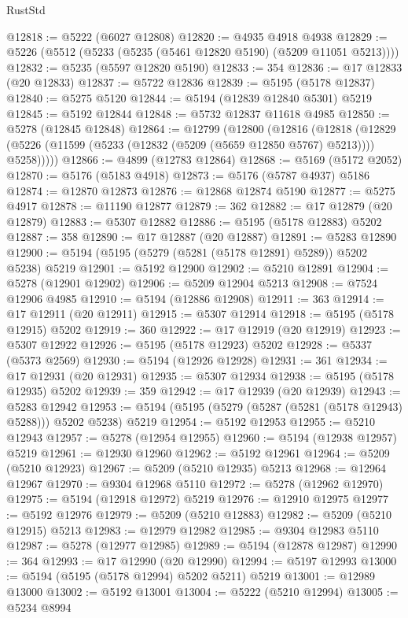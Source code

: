 \begin{lexlean}{RustStd}
\begin{coremodule}
@12818 := @5222 (@6027 @12808)
@12820 := @4935 @4918 @4938
@12829 := @5226 (@5512 (@5233 (@5235 (@5461 @12820 @5190) (@5209 @11051 @5213))))
@12832 := @5235 (@5597 @12820 @5190)
@12833 := 354
@12836 := @17 @12833 (@20 @12833)
@12837 := @5722 @12836
@12839 := @5195 (@5178 @12837)
@12840 := @5275 @5120
@12844 := @5194 (@12839 @12840 @5301) @5219
@12845 := @5192 @12844
@12848 := @5732 @12837 @11618 @4985
@12850 := @5278 (@12845 @12848)
@12864 := @12799
    (@12800
      (@12816
        (@12818
          (@12829 (@5226 (@11599 (@5233 (@12832 (@5209 (@5659 @12850 @5767) @5213)))) @5258)))))
@12866 := @4899 (@12783 @12864)
@12868 := @5169 (@5172 @2052)
@12870 := @5176 (@5183 @4918)
@12873 := @5176 (@5787 @4937) @5186
@12874 := @12870 @12873
@12876 := @12868 @12874 @5190
@12877 := @5275 @4917
@12878 := @11190 @12877
@12879 := 362
@12882 := @17 @12879 (@20 @12879)
@12883 := @5307 @12882
@12886 := @5195 (@5178 @12883) @5202
@12887 := 358
@12890 := @17 @12887 (@20 @12887)
@12891 := @5283 @12890
@12900 := @5194 (@5195 (@5279 (@5281 (@5178 @12891) @5289)) @5202 @5238) @5219
@12901 := @5192 @12900
@12902 := @5210 @12891
@12904 := @5278 (@12901 @12902)
@12906 := @5209 @12904 @5213
@12908 := @7524 @12906 @4985
@12910 := @5194 (@12886 @12908)
@12911 := 363
@12914 := @17 @12911 (@20 @12911)
@12915 := @5307 @12914
@12918 := @5195 (@5178 @12915) @5202
@12919 := 360
@12922 := @17 @12919 (@20 @12919)
@12923 := @5307 @12922
@12926 := @5195 (@5178 @12923) @5202
@12928 := @5337 (@5373 @2569)
@12930 := @5194 (@12926 @12928)
@12931 := 361
@12934 := @17 @12931 (@20 @12931)
@12935 := @5307 @12934
@12938 := @5195 (@5178 @12935) @5202
@12939 := 359
@12942 := @17 @12939 (@20 @12939)
@12943 := @5283 @12942
@12953 := @5194 (@5195 (@5279 (@5287 (@5281 (@5178 @12943) @5288))) @5202 @5238) @5219
@12954 := @5192 @12953
@12955 := @5210 @12943
@12957 := @5278 (@12954 @12955)
@12960 := @5194 (@12938 @12957) @5219
@12961 := @12930 @12960
@12962 := @5192 @12961
@12964 := @5209 (@5210 @12923)
@12967 := @5209 (@5210 @12935) @5213
@12968 := @12964 @12967
@12970 := @9304 @12968 @5110
@12972 := @5278 (@12962 @12970)
@12975 := @5194 (@12918 @12972) @5219
@12976 := @12910 @12975
@12977 := @5192 @12976
@12979 := @5209 (@5210 @12883)
@12982 := @5209 (@5210 @12915) @5213
@12983 := @12979 @12982
@12985 := @9304 @12983 @5110
@12987 := @5278 (@12977 @12985)
@12989 := @5194 (@12878 @12987)
@12990 := 364
@12993 := @17 @12990 (@20 @12990)
@12994 := @5197 @12993
@13000 := @5194 (@5195 (@5178 @12994) @5202 @5211) @5219
@13001 := @12989 @13000
@13002 := @5192 @13001
@13004 := @5222 (@5210 @12994)
@13005 := @5234 @8994

\end{coremodule}
\end{lexlean}

